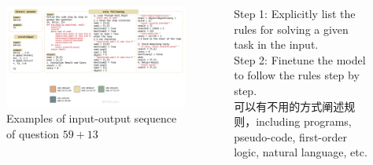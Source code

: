 \documentclass[aspectratio=169]{beamer}
\begin{document}
\begin{frame}
    \begin{columns}
        \begin{column}{.7\textwidth}
    \begin{figure}[t]
        \centering
        \includegraphics[width=\textwidth]{pic/prompt_new.pdf}
        \vspace{-5pt}
        \caption{Examples of input-output sequence of question $59+13$}
        \label{prompt}
    \end{figure}
\end{column}
\begin{column}{.3\textwidth}
    Step 1: Explicitly list the rules for solving a given task in the input.\\[0.2cm]

    Step 2: Finetune the model to follow the rules step by step.\\[0.2cm]

    可以有不用的方式阐述规则，including programs, pseudo-code, first-order logic, natural language, etc.
\end{column}
\end{columns}
\end{frame}
\end{document}
